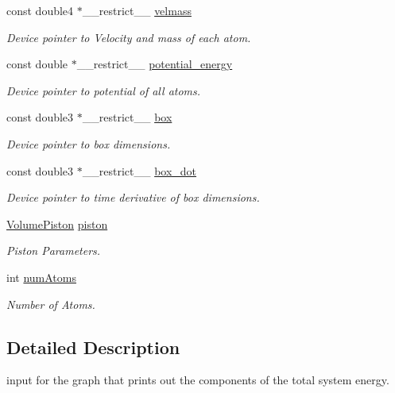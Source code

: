 \begin{DoxyCompactItemize}
\item 
const double4 $\ast$\+\_\+\+\_\+restrict\+\_\+\+\_\+ \hyperlink{structPrintEnergiesGraphInputs_adc38d3e47b0b4ab22dfb7b0253ccefff}{velmass}
\begin{DoxyCompactList}\small\item\em Device pointer to Velocity and mass of each atom. \end{DoxyCompactList}\item 
const double $\ast$\+\_\+\+\_\+restrict\+\_\+\+\_\+ \hyperlink{structPrintEnergiesGraphInputs_a6faa1be5d040282aca80b029942ab2eb}{potential\+\_\+energy}
\begin{DoxyCompactList}\small\item\em Device pointer to potential of all atoms. \end{DoxyCompactList}\item 
const double3 $\ast$\+\_\+\+\_\+restrict\+\_\+\+\_\+ \hyperlink{structPrintEnergiesGraphInputs_a1e348a5a2a281ba456f7fa8955b43c02}{box}
\begin{DoxyCompactList}\small\item\em Device pointer to box dimensions. \end{DoxyCompactList}\item 
const double3 $\ast$\+\_\+\+\_\+restrict\+\_\+\+\_\+ \hyperlink{structPrintEnergiesGraphInputs_a19e4bdc53ef87010bb737cb6860ec653}{box\+\_\+dot}
\begin{DoxyCompactList}\small\item\em Device pointer to time derivative of box dimensions. \end{DoxyCompactList}\item 
\hyperlink{structVolumePiston}{Volume\+Piston} \hyperlink{structPrintEnergiesGraphInputs_a37b64e2334e0ee6481ecb96081417f2a}{piston}
\begin{DoxyCompactList}\small\item\em Piston Parameters. \end{DoxyCompactList}\item 
int \hyperlink{structPrintEnergiesGraphInputs_a959260c65f04a41a113f62ef76504966}{num\+Atoms}
\begin{DoxyCompactList}\small\item\em Number of Atoms. \end{DoxyCompactList}\end{DoxyCompactItemize}


\subsection{Detailed Description}
input for the graph that prints out the components of the total system energy. 



